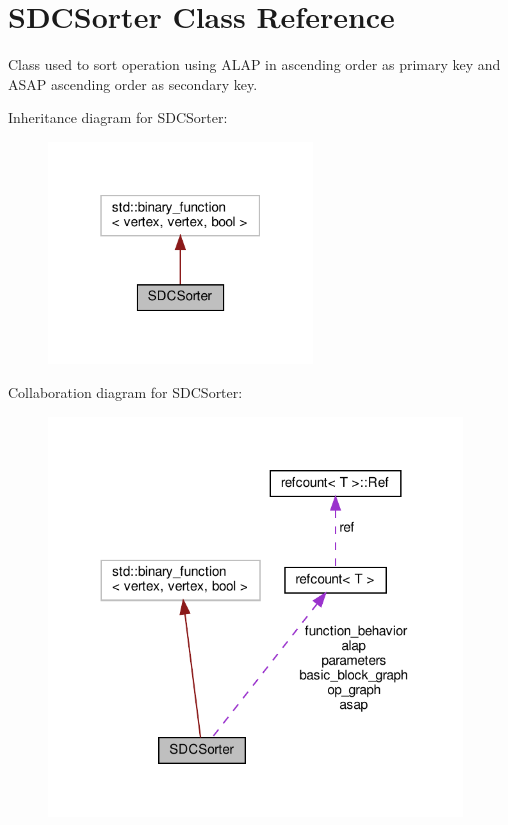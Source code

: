 \hypertarget{classSDCSorter}{}\section{S\+D\+C\+Sorter Class Reference}
\label{classSDCSorter}


Class used to sort operation using A\+L\+AP in ascending order as primary key and A\+S\+AP ascending order as secondary key.  




Inheritance diagram for S\+D\+C\+Sorter\+:
\nopagebreak
\begin{figure}[H]
\begin{center}
\leavevmode
\includegraphics[width=199pt]{df/d9b/classSDCSorter__inherit__graph}
\end{center}
\end{figure}


Collaboration diagram for S\+D\+C\+Sorter\+:
\nopagebreak
\begin{figure}[H]
\begin{center}
\leavevmode
\includegraphics[width=311pt]{d2/d8f/classSDCSorter__coll__graph}
\end{center}
\end{figure}
